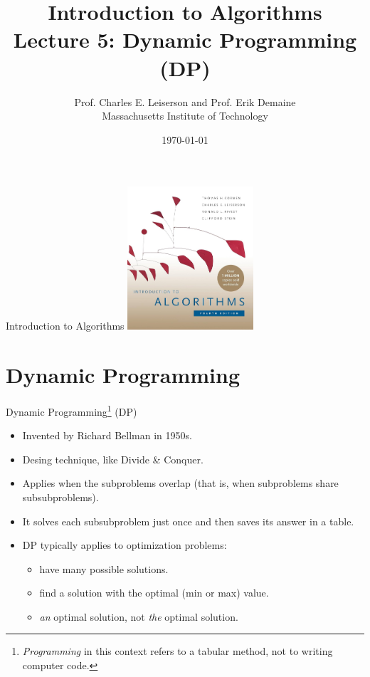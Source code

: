 \documentclass[aspectratio=169]{beamer}
\title[L5 DP]{Introduction to Algorithms \\ Lecture 5: Dynamic Programming (DP)}
\author{Prof. Charles E. Leiserson and Prof. Erik Demaine \\ Massachusetts Institute of Technology}
\date{\today}
\begin{document}
\frame{\titlepage}

\begin{frame}{Introduction to Algorithms}
    \centering
    \includegraphics[width=0.35\textwidth]{figures/book_cover.jpg} \\
\end{frame}

\section{Dynamic Programming}

\begin{frame}{Dynamic Programming\footnote{\textit{Programming} in this context refers to a tabular method, not to writing computer code.} (DP)}
    \begin{itemize}
        \item Invented by Richard Bellman in 1950s.
        \item Desing technique, like Divide \& Conquer.
        \item Applies when the subproblems overlap (that is, when subproblems share subsubproblems).
        \item It solves each subsubproblem just once and then saves its answer in a table.
        \item DP typically applies to optimization problems:
        \begin{itemize}
            \item have many possible solutions.
            \item find a solution with the optimal (min or max) value.
            \item \textit{an} optimal solution, not \textit{the} optimal solution.
        \end{itemize}
    \end{itemize}
\end{frame}
\end{document}
